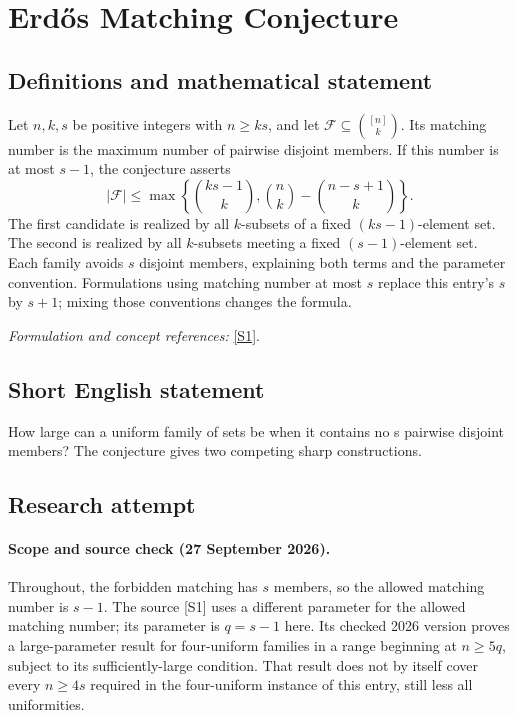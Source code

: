 \documentclass[11pt]{article}
\begin{document}
\section*{\texorpdfstring{Erdős Matching Conjecture}{Erdős Matching Conjecture}}\label{statement}
\subsection{Definitions and mathematical statement}
Let $n,k,s$ be positive integers with $n\ge ks$, and let $\mathcal F\subseteq\binom{[n]}k$. Its matching number is the maximum number of pairwise disjoint members. If this number is at most $s-1$, the conjecture asserts
\[
 |\mathcal F|\le
 \max\left\{\binom{ks-1}{k},
 \binom nk-\binom{n-s+1}{k}\right\}.
\]
The first candidate is realized by all $k$-subsets of a fixed $(ks-1)$-element set. The second is realized by all $k$-subsets meeting a fixed $(s-1)$-element set. Each family avoids $s$ disjoint members, explaining both terms and the parameter convention. Formulations using matching number at most $s$ replace this entry's $s$ by $s+1$; mixing those conventions changes the formula.
\par\smallskip\textit{Formulation and concept references:} \href{https://arxiv.org/pdf/2602.19230}{[S1]}.

\subsection{Short English statement}
How large can a uniform family of sets be when it contains no s pairwise disjoint members? The conjecture gives two competing sharp constructions.
\subsection{Research attempt}
\paragraph{Scope and source check (27 September 2026).}
Throughout, the forbidden matching has $s$ members, so the allowed matching number is $s-1$. The source [S1] uses a different parameter for the allowed matching number; its parameter is $q=s-1$ here. Its checked 2026 version proves a large-parameter result for four-uniform families in a range beginning at $n\geq5q$, subject to its sufficiently-large condition. That result does not by itself cover every $n\geq4s$ required in the four-uniform instance of this entry, still less all uniformities.
\end{document}
